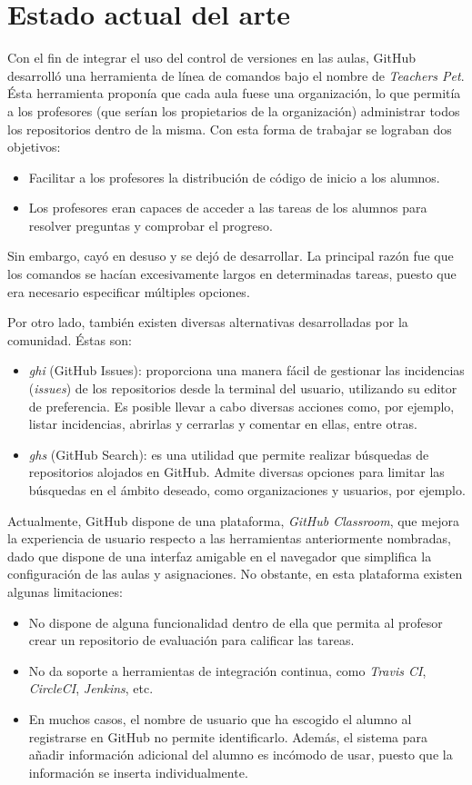 \section{Estado actual del arte}
\label{1:sec:2}
Con el fin de integrar el uso del control de versiones en las aulas, GitHub desarrolló una herramienta de línea de comandos bajo el nombre de {\it Teachers Pet}. Ésta herramienta proponía que cada aula fuese una
organización, lo que permitía a los profesores (que serían los propietarios de la organización) administrar todos los repositorios dentro de la misma. Con esta forma de trabajar se lograban dos objetivos:
\begin{itemize}
  \item Facilitar a los profesores la distribución de código de inicio a los alumnos.
  \item Los profesores eran capaces de acceder a las tareas de los alumnos para resolver preguntas y comprobar el progreso.
\end{itemize}
Sin embargo, cayó en desuso y se dejó de desarrollar. La principal razón fue que los comandos se hacían excesivamente largos en determinadas tareas, puesto que era necesario especificar múltiples opciones.
\bigskip

Por otro lado, también existen diversas alternativas desarrolladas por la comunidad. Éstas son:
\begin{itemize}
  \item {\it ghi} (GitHub Issues): proporciona una manera fácil de gestionar las incidencias ({\it issues}) de los repositorios desde la terminal del usuario, utilizando su editor de preferencia. Es posible llevar a cabo diversas acciones como, por ejemplo,
  listar incidencias, abrirlas y cerrarlas y comentar en ellas, entre otras.
  \item {\it ghs} (GitHub Search): es una utilidad que permite realizar búsquedas de repositorios alojados en GitHub. Admite diversas opciones para limitar las búsquedas en el ámbito deseado, como organizaciones y usuarios, por ejemplo.
\end{itemize}

Actualmente, GitHub dispone de una plataforma, {\it GitHub Classroom}, que mejora la experiencia de usuario respecto a las herramientas anteriormente nombradas, dado que dispone de una interfaz amigable en el navegador que simplifica
la configuración de las aulas y asignaciones. No obstante, en esta plataforma existen algunas limitaciones:
\begin{itemize}
  \item No dispone de alguna funcionalidad dentro de ella que permita al profesor crear un repositorio de evaluación para calificar las tareas.
  \item No da soporte a herramientas de integración continua, como {\it Travis CI}, {\it CircleCI}, {\it Jenkins}, etc.
  \item En muchos casos, el nombre de usuario que ha escogido el alumno al registrarse en GitHub no permite identificarlo. Además, el sistema para añadir información adicional del alumno es incómodo de usar,
  puesto que la información se inserta individualmente.
\end{itemize}
